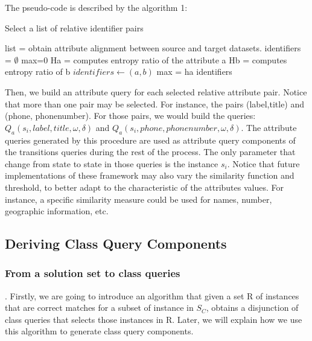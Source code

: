 The pseudo-code is described by the algorithm 1:

\begin{algorithm}
\caption{Select a list of relative identifier pairs}
\begin{algorithmic}
\STATE list = obtain attribute alignment between source and target datasets.
\STATE identifiers = $\emptyset$
\STATE max=0
\STATE Ha = computes entropy ratio of the attribute a
\STATE Hb = computes entropy ratio of b
\STATE $identifiers \leftarrow  (a,b)$
\STATE max = ha
\ENDIF
\ENDFOR
\RETURN identifiers
\end{algorithmic}
\end{algorithm}
 
Then, we build an attribute query for each selected relative attribute pair. Notice that more than one pair may be selected. For instance, the pairs (label,title) and (phone, phonenumber). For those pairs, we would build the queries: $Q_a(s_i,label,title, \omega, \delta)$ and $Q_a( s_i, phone, phonenumber,  \omega, \delta)$. The attribute queries generated by this procedure are used as attribute query components of the transitions queries during the rest of the process. The only parameter that change from state to state in those queries is the instance $s_i$. Notice that future implementations of these framework may also vary the similarity function and threshold,  to better adapt to the characteristic of the attributes values. For instance, a specific similarity measure could be used for names, number, geographic information, etc.

\subsection{Deriving Class Query Components} 

\subsubsection{From a solution set to class queries}. Firstly, we are going to introduce an algorithm that given a set R of instances that are correct matches for a subset of instance in $S_C$, obtains a disjunction of class queries that selects those instances in R. Later, we will explain how we use this algorithm to generate class query components.  

